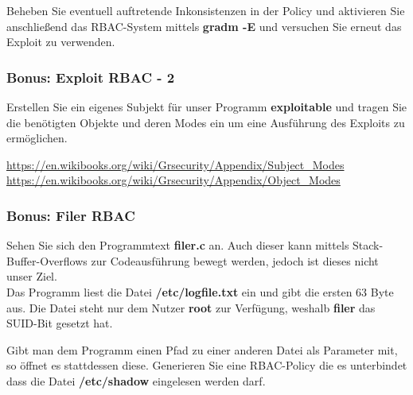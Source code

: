 Beheben Sie eventuell auftretende Inkonsistenzen in der Policy und aktivieren Sie anschließend das RBAC-System mittels \textbf{gradm -E} und versuchen Sie erneut das Exploit zu verwenden.

\subsubsection{Bonus: Exploit RBAC - 2}
\label{subsubsec:Bonus: Exploit RBAC - 2}

Erstellen Sie ein eigenes Subjekt für unser Programm \textbf{exploitable} und tragen Sie die benötigten Objekte und deren Modes ein um eine Ausführung des Exploits zu ermöglichen.

\url{https://en.wikibooks.org/wiki/Grsecurity/Appendix/Subject\_Modes}
\url{https://en.wikibooks.org/wiki/Grsecurity/Appendix/Object\_Modes}

\subsubsection{Bonus: Filer RBAC}
\label{subsubsec:Bonus: Filer RBAC}

Sehen Sie sich den Programmtext \textbf{filer.c} an. Auch dieser kann mittels Stack-Buffer-Overflows zur Codeausführung bewegt werden, jedoch ist dieses nicht unser Ziel.\\
Das Programm liest die Datei \textbf{/etc/logfile.txt} ein und gibt die ersten 63 Byte aus. Die Datei steht nur dem Nutzer \textbf{root} zur Verfügung, weshalb \textbf{filer} das SUID-Bit gesetzt hat.

Gibt man dem Programm einen Pfad zu einer anderen Datei als Parameter mit, so öffnet es stattdessen diese. Generieren Sie eine RBAC-Policy die es unterbindet dass die Datei \textbf{/etc/shadow} eingelesen werden darf.